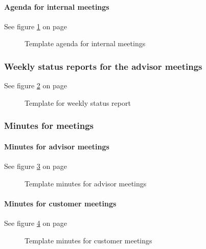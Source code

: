 \paragraph{Agenda for internal meetings} \hfill
\newline
See figure \ref{fig:agendainternal} on page \pageref{fig:agendainternal}
\begin{figure}[hbt]
\begin{center}
\caption{Template agenda for internal meetings}\label{fig:agendainternal}
\end{center}
\end{figure}

\subsubsection{Weekly status reports for the advisor meetings}
See figure \ref{fig:weekly} on page \pageref{fig:weekly}
\begin{figure}[hbt]
\begin{center}
\caption{Template for weekly status report}\label{fig:weekly}
\end{center}
\end{figure}

\subsubsection{Minutes for meetings}

\paragraph{Minutes for advisor meetings} \hfill
\newline
See figure \ref{fig:minutesadvisor} on page \pageref{fig:minutesadvisor}
\begin{figure}[hbt]
\begin{center}
\caption{Template minutes for advisor meetings}\label{fig:minutesadvisor}
\end{center}
\end{figure}

\paragraph{Minutes for customer meetings} \hfill
\newline
See figure \ref{fig:minutescustomer} on page \pageref{fig:minutescustomer}
\begin{figure}[hbt]
\begin{center}
\caption{Template minutes for customer meetings}\label{fig:minutescustomer}
\end{center}
\end{figure}

